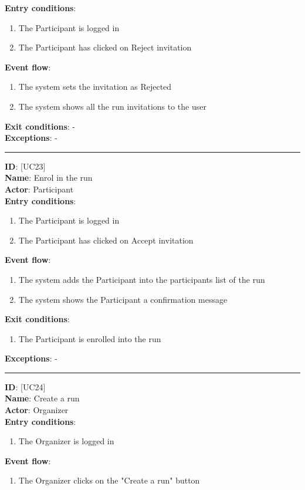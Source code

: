 \documentclass[hidelinks, 12pt]{report}
\newcommand\usecase[1]{ [UC#1] }
\begin{document}
\begin{itemize}
		\textbf{Entry conditions}:
		\begin{enumerate}
			\item{The Participant is logged in}
			\item{The Participant has clicked on Reject invitation}
		\end{enumerate}
		\textbf{Event flow}:
		\begin{enumerate}
			\item{The system sets the invitation as Rejected}
			\item{The system shows all the run invitations to the user}
		\end{enumerate}
		\textbf{Exit conditions}: - \\
		\textbf{Exceptions}: - \\
		\rule{\linewidth}{0.4pt}
		\textbf{ID}: \usecase{23} \\
		\textbf{Name}: Enrol in the run \\
		\textbf{Actor}: Participant \\
		\textbf{Entry conditions}:
		\begin{enumerate}
			\item{The Participant is logged in}
			\item{The Participant has clicked on Accept invitation}
		\end{enumerate}
		\textbf{Event flow}:
		\begin{enumerate}
			\item{The system adds the Participant into the participants list of the run}
			\item{The system shows the Participant a confirmation message}
		\end{enumerate}
		\textbf{Exit conditions}:
		\begin{enumerate}
			\item{The Participant is enrolled into the run}
		\end{enumerate}
		\textbf{Exceptions}: - \\
		\rule{\linewidth}{0.4pt}
		\textbf{ID}: \usecase{24} \\
		\textbf{Name}: Create a run \\
		\textbf{Actor}: Organizer \\
		\textbf{Entry conditions}:
		\begin{enumerate}
			\item{The Organizer is logged in}
		\end{enumerate}
		\textbf{Event flow}:
		\begin{enumerate}
			\item{The Organizer clicks on the "Create a run" button}

\end{enumerate}
\end{itemize}
\end{document}
